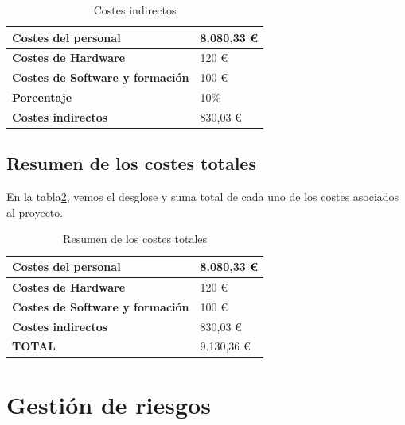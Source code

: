 \begin{table}[htpb]
\centering
\begin{tabular}{|l|l|}
\hline
\textbf{Costes del personal}            & 8.080,33 \euro \\ \hline
\textbf{Costes de Hardware}             & 120 \euro      \\ \hline
\textbf{Costes de Software y formación} & 100 \euro      \\ \hline
\textbf{Porcentaje}                     & 10\%       \\ \hline
\textbf{Costes indirectos}              & 830,03 \euro   \\ \hline
\end{tabular}
\caption{Costes indirectos}
\label{fig:coste_indirecto}
\end{table}


\subsection{Resumen de los costes totales}
En la tabla\ref{fig:coste_total}, vemos el desglose y suma total de cada uno de los costes asociados al proyecto.


\begin{table}[htpb]
\centering
\begin{tabular}{|l|l|}
\hline
\textbf{Costes del personal}            & 8.080,33 \euro \\ \hline
\textbf{Costes de Hardware}             & 120 \euro      \\ \hline
\textbf{Costes de Software y formación} & 100 \euro      \\ \hline
\textbf{Costes indirectos}              & 830,03 \euro   \\ \hline
\textbf{TOTAL}                          & 9.130,36 \euro \\ \hline
\end{tabular}
\caption{Resumen de los costes totales}
\label{fig:coste_total}
\end{table}






\section{Gestión de riesgos}

